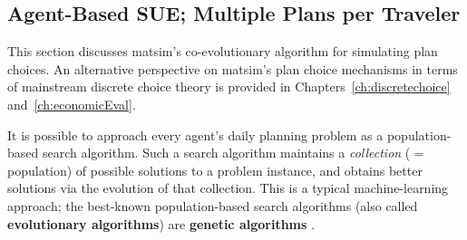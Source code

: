 \subsection{Agent-Based SUE; Multiple Plans per Traveler}
\label{sec:agent-based-sue}

This section discusses \gls{matsim}'s co-evolutionary algorithm for simulating
plan choices. An alternative perspective on \gls{matsim}'s plan choice mechanisms
in terms of mainstream discrete choice theory \citep{BenAkivaLerman_1985} is
provided in Chapters~\ref{ch:discretechoice} and~\ref{ch:economicEval}.

% 

It is possible to approach every agent's daily
planning problem as a population-based search algorithm.  Such a
search algorithm maintains a \emph{collection} ($=$ population) of
possible solutions to a problem instance, and obtains better solutions
via the evolution of that collection.  This is a typical
machine-learning \citep[e.g.][]{RussellNorvigBook} approach; the best-known
population-based search algorithms (also called \textbf{evolutionary
algorithms}) are \textbf{genetic algorithms} \citep[e.g.,][]{GoldbergBook}.


